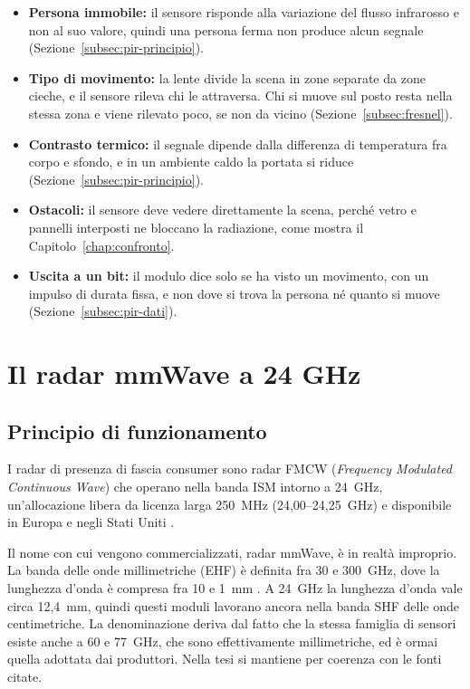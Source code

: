 \begin{itemize}
    \item \textbf{Persona immobile:} il sensore risponde alla variazione del flusso infrarosso e non al suo valore, quindi una persona ferma non produce alcun segnale (Sezione~\ref{subsec:pir-principio}).

    \item \textbf{Tipo di movimento:} la lente divide la scena in zone separate da zone cieche, e il sensore rileva chi le attraversa. Chi si muove sul posto resta nella stessa zona e viene rilevato poco, se non da vicino (Sezione~\ref{subsec:fresnel}).

    \item \textbf{Contrasto termico:} il segnale dipende dalla differenza di temperatura fra corpo e sfondo, e in un ambiente caldo la portata si riduce (Sezione~\ref{subsec:pir-principio}).

    \item \textbf{Ostacoli:} il sensore deve vedere direttamente la scena, perché vetro e pannelli interposti ne bloccano la radiazione, come mostra il Capitolo~\ref{chap:confronto}.

    \item \textbf{Uscita a un bit:} il modulo dice solo se ha visto un movimento, con un impulso di durata fissa, e non dove si trova la persona né quanto si muove (Sezione~\ref{subsec:pir-dati}).
\end{itemize}

\section{Il radar mmWave a 24 GHz}
\label{sec:mmwave}

\subsection{Principio di funzionamento}
\label{subsec:fmcw}

I radar di presenza di fascia consumer sono radar FMCW (\textit{Frequency Modulated Continuous Wave}) che operano nella banda ISM intorno a 24~GHz, un'allocazione libera da licenza larga 250~MHz (24,00--24,25~GHz) e disponibile in Europa e negli Stati Uniti \cite{ituRR}.

Il nome con cui vengono commercializzati, radar mmWave, è in realtà improprio. La banda delle onde millimetriche (EHF) è definita fra 30 e 300~GHz, dove la lunghezza d'onda è compresa fra 10 e 1~mm \cite{ituRR}. A 24~GHz la lunghezza d'onda vale circa 12,4~mm, quindi questi moduli lavorano ancora nella banda SHF delle onde centimetriche. La denominazione deriva dal fatto che la stessa famiglia di sensori esiste anche a 60 e 77~GHz, che sono effettivamente millimetriche, ed è ormai quella adottata dai produttori. Nella tesi si mantiene per coerenza con le fonti citate.

